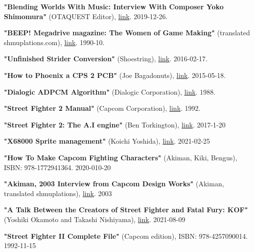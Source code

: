 \begin{thebibliography}{999}
  \textbf{"Blending Worlds With Music: Interview With Composer Yoko Shimomura"} (OTAQUEST Editor),
  \href{https://www.otaquest.com/yoko-shimomura-interview/}{link}.
  2019-12-26.
  
  \textbf{"BEEP! Megadrive magazine: The Women of Game Making"} (translated shmuplations.com),
  \href{https://shmuplations.com/womenofgamedesign/}{link}.
  1990-10.

  \textbf{"Unfinished Strider Conversion"} (Shoestring),
  \href{https://www.jammarcade.net/strider-conversion/}{link}.
  2016-02-17.

  \textbf{"How to Phoenix a CPS 2 PCB"} (Joe Bagadonuts),
  \href{https://www.youtube.com/watch?v=HFj8Mkw_kog}{link}.
  2015-05-18.

  \textbf{"Dialogic ADPCM Algorithm"} (Dialogic Corporation),
  \href{https://multimedia.cx/mirror/dialogic-adpcm.pdf}{link}.
  1988.



  \textbf{"Street Fighter 2 Manual"} (Capcom Corporation),
  \href{https://www.gamesdatabase.org/Media/SYSTEM/Arcade/Manual/formated/Street_Fighter_II--_Champion_Edition_-_1992_-_Capcom.pdf}{link}.
  1992.

  \textbf{"Street Fighter 2: The A.I engine"} (Ben Torkington),
  \href{https://sf2platinum.wordpress.com/2017/01/20/the-ai-engine}{link}.
  2017-1-20

  \textbf{"X68000 Sprite management"} (Koichi Yoshida),
  \href{https://yosshin4004-github-io.translate.goog/x68k/xsp/index.html?_x_tr_sl=ja&_x_tr_tl=en&_x_tr_hl=en-US}{link}.
  2021-02-25

  \textbf{"How To Make Capcom Fighting Characters"} (Akiman, Kiki, Bengus),
  ISBN: 978-1772941364.
  2020-010-20

  \textbf{"Akiman, 2003 Interview from Capcom Design Works"} (Akiman, translated shmuplations),
  \href{http://shmuplations.com/akirayasuda/}{link}.
  2003

  \textbf{"A Talk Between the Creators of Street Fighter and Fatal Fury: KOF"} (Yoshiki Okamoto and Takashi Nishiyama),
  \href{https://www.youtube.com/watch?v=uqRFod7nuHo&t}{link}.
  2021-08-09

  \textbf{"Street Fighter II Complete File"} (Capcom edition),
  ISBN: 978-4257090014.
  1992-11-15


\end{thebibliography}
